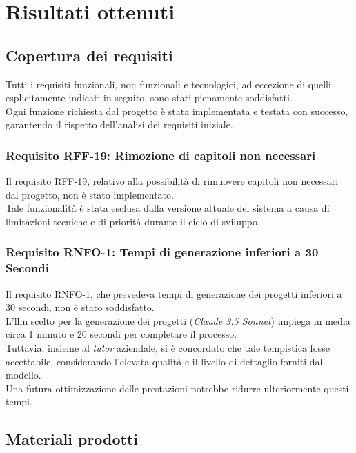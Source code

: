 \pagebreak \section{Risultati ottenuti}
\label{sez:risultati-ottenuti}


\pagebreak
\subsection{Copertura dei requisiti}
\label{subsec:copertura-requisiti}

Tutti i requisiti funzionali, non funzionali e tecnologici, ad eccezione di quelli esplicitamente indicati in seguito, sono stati pienamente soddisfatti.\\
Ogni funzione richiesta dal progetto è stata implementata e testata con successo, garantendo il rispetto dell'analisi dei requisiti iniziale.

\subsubsection{Requisito RFF-19: Rimozione di capitoli non necessari}
\noindent Il requisito RFF-19, relativo alla possibilità di rimuovere capitoli non necessari dal progetto, non è stato implementato.\\
Tale funzionalità è stata esclusa dalla versione attuale del sistema a causa di limitazioni tecniche e di priorità durante il ciclo di sviluppo.

\subsubsection{Requisito RNFO-1: Tempi di generazione inferiori a 30 Secondi}
\noindent Il requisito RNFO-1, che prevedeva tempi di generazione dei progetti inferiori a 30 secondi, non è stato soddisfatto.\\
L'\gls{llm} scelto per la generazione dei progetti (\textit{Claude 3.5 Sonnet}) impiega in media circa 1 minuto e 20 secondi per completare il processo.\\
Tuttavia, insieme al \textit{tutor} aziendale, si è concordato che tale tempistica fosse accettabile, considerando l'elevata qualità e il livello di dettaglio forniti dal modello.\\
Una futura ottimizzazione delle prestazioni potrebbe ridurre ulteriormente questi tempi.

\subsection{Materiali prodotti}
\label{subsec:materiali-prodotti}

